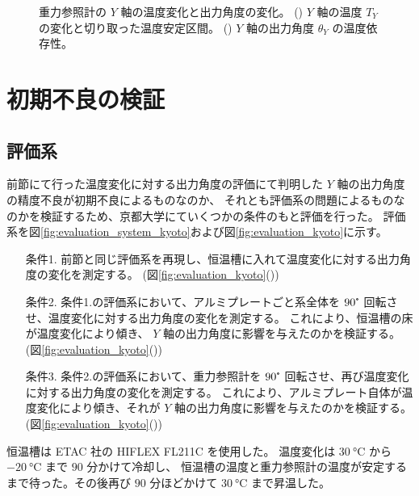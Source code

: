 \documentclass[../../main.tex]{subfiles}
\begin{document}
\begin{figure}[H]
\begin{minipage}[b]{0.45\columnwidth}
        \subcaption{}
        \label{fig:angleY_temp_dep}
    \end{minipage}
    \caption{重力参照計の $Y$ 軸の温度変化と出力角度の変化。
             () $Y$ 軸の温度 $T_{Y}$ の変化と切り取った温度安定区間。
             () $Y$ 軸の出力角度 $\theta_{Y}$ の温度依存性。}
    \label{fig:evaluation_bath_Yaxis}
\end{figure}
\section{初期不良の検証}
\subsection{評価系}
前節にて行った温度変化に対する出力角度の評価にて判明した $Y$ 軸の出力角度の精度不良が初期不良によるものなのか、
それとも評価系の問題によるものなのかを検証するため、京都大学にていくつかの条件のもと評価を行った。
評価系を図\ref{fig:evaluation_system_kyoto}および図\ref{fig:evaluation_kyoto}に示す。
\begin{enumerate}
    \item[条件1.] 前節と同じ評価系を再現し、恒温槽に入れて温度変化に対する出力角度の変化を測定する。
                 (図\ref{fig:evaluation_kyoto}())
    \item[条件2.] 条件1.の評価系において、アルミプレートごと系全体を $90\tcdegree$ 回転させ、温度変化に対する出力角度の変化を測定する。
                 これにより、恒温槽の床が温度変化により傾き、 $Y$ 軸の出力角度に影響を与えたのかを検証する。
                 (図\ref{fig:evaluation_kyoto}())
    \item[条件3.] 条件2.の評価系において、重力参照計を $90\tcdegree$ 回転させ、再び温度変化に対する出力角度の変化を測定する。
                 これにより、アルミプレート自体が温度変化により傾き、それが $Y$ 軸の出力角度に影響を与えたのかを検証する。
                 (図\ref{fig:evaluation_kyoto}())
\end{enumerate}
恒温槽は ETAC 社の HIFLEX FL211C を使用した。
温度変化は $\SI{30}{\degreeCelsius}$ から $\SI{-20}{\degreeCelsius}$ まで $90$ 分かけて冷却し、
恒温槽の温度と重力参照計の温度が安定するまで待った。その後再び $90$ 分ほどかけて $\SI{30}{\degreeCelsius}$ まで昇温した。
\end{document}
